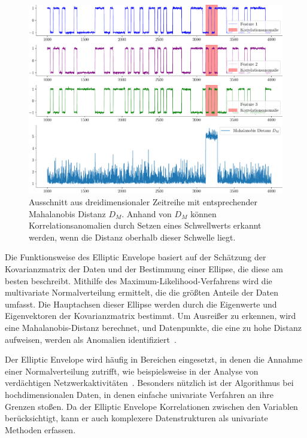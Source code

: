 \begin{figure}[t!]
    \centering
        \includegraphics[width=1\linewidth]{ch4_anomalien/abbildungen/EE_mahalanobis.pdf}
    \caption{Ausschnitt aus dreidimensionaler Zeitreihe mit entsprechender Mahalanobis Distanz $D_M$. Anhand von $D_M$ können Korrelationsanomalien
        durch Setzen eines Schwellwerts erkannt werden, wenn die Distanz oberhalb dieser Schwelle liegt.}
\label{fig:EE_mahalanobis}
\end{figure}

Die Funktionsweise des Elliptic Envelope basiert auf der Schätzung der Kovarianzmatrix der Daten und der Bestimmung einer Ellipse, die diese am besten
beschreibt. Mithilfe des Maximum-Likelihood-Verfahrens wird die multivariate Normalverteilung ermittelt, die die größten Anteile der Daten umfasst. Die
Hauptachsen dieser Ellipse werden durch die Eigenwerte und Eigenvektoren der Kovarianzmatrix bestimmt. Um Ausreißer zu erkennen, wird eine
Mahalanobis-Distanz berechnet, und Datenpunkte, die eine zu hohe Distanz aufweisen, werden als Anomalien identifiziert~\cite{Ashrafuzzaman2020}.

Der Elliptic Envelope wird häufig in Bereichen eingesetzt, in denen die Annahme einer Normalverteilung zutrifft, wie beispielsweise in der Analyse von
verdächtigen Netzwerkaktivitäten~\cite{Ashrafuzzaman2020}. Besonders nützlich ist der Algorithmus bei hochdimensionalen Daten, in denen
einfache univariate Verfahren an ihre Grenzen stoßen. Da der Elliptic Envelope Korrelationen zwischen den Variablen berücksichtigt, kann er auch
komplexere Datenstrukturen als univariate Methoden erfassen.

